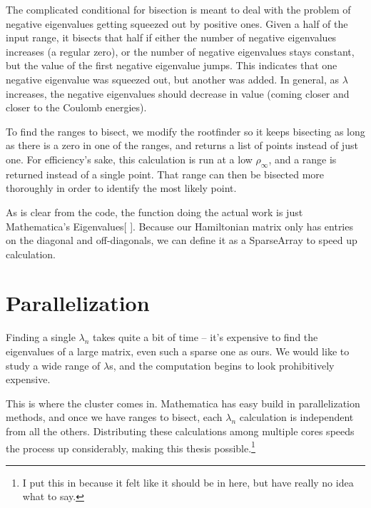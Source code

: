 \documentclass[12pt,twoside]{reedthesis}
\begin{document}
The complicated conditional for bisection is meant to deal with the problem of negative eigenvalues getting squeezed out by positive ones. Given a half of the input range, it bisects that half if either the number of negative eigenvalues increases (a regular zero), or the number of negative eigenvalues stays constant, but the value of the first negative eigenvalue jumps. This indicates that one negative eigenvalue was squeezed out, but another was added. In general, as $\lambda$ increases, the negative eigenvalues should decrease in value (coming closer and closer to the Coulomb energies). 

To find the ranges to bisect, we modify the rootfinder so it keeps bisecting as long as there is a zero in one of the ranges, and returns a list of points instead of just one. For efficiency's sake, this calculation is run at a low $\rho_{\infty}$, and a range is returned instead of a single point. That range can then be bisected more thoroughly in order to identify the most likely point. 

As is clear from the code, the function doing the actual work is just Mathematica's Eigenvalues[ ]. Because our Hamiltonian matrix only has entries on the diagonal and off-diagonals, we can define it as a SparseArray to speed up calculation. 

\section{Parallelization}

Finding a single $\lambda_{n}$ takes quite a bit of time -- it's expensive to find the eigenvalues of a large matrix, even such a sparse one as ours. We would like to study a wide range of $\lambda$s, and the computation begins to look prohibitively expensive.

This is where the cluster comes in. Mathematica has easy build in parallelization methods, and once we have ranges to bisect, each $\lambda_{n}$ calculation is independent from all the others. Distributing these calculations among multiple cores speeds the process up considerably, making this thesis possible.\footnote{I put this in because it felt like it should be in here, but have really no idea what to say.}

%
%
%
\backmatter %
%
\end{document}
